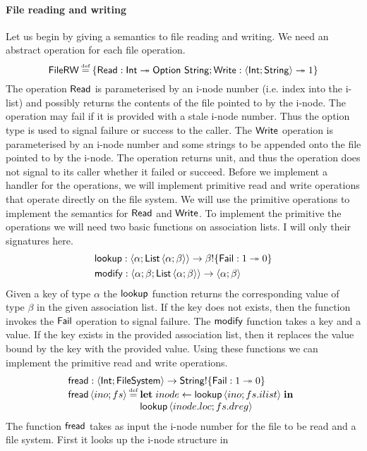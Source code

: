 \documentclass[12pt,phd,lfcs,twoside,openright,logo,leftchapter,normalheadings]{infthesis}
\theoremstyle{plain}
\theoremstyle{definition}
\begin{document}
\paragraph{File reading and writing}
%
Let us begin by giving a semantics to file reading and writing. We
need an abstract operation for each file operation.
%
\[
  \dec{FileRW} \defas \{\URead : \Int \opto \Option~\String;\UWrite : \Record{\Int;\String} \opto \UnitType\}
\]
%
The operation $\mathsf{Read}$ is parameterised by an i-node number
(i.e. index into the i-list) and possibly returns the contents of the
file pointed to by the i-node. The operation may fail if it is
provided with a stale i-node number. Thus the option type is used to
signal failure or success to the caller.
%
The $\mathsf{Write}$ operation is parameterised by an i-node number and some
strings to be appended onto the file pointed to by the i-node. The
operation returns unit, and thus the operation does not signal to its
caller whether it failed or succeed.
%
Before we implement a handler for the operations, we will implement
primitive read and write operations that operate directly on the file
system. We will use the primitive operations to implement the
semantics for $\mathsf{Read}$ and $\mathsf{Write}$. To implement the primitive the
operations we will need two basic functions on association lists. I
will only their signatures here.
%
\[
  \bl
    \lookup : \Record{\alpha;\List\,\Record{\alpha;\beta}} \to \beta \eff \{\Fail : \UnitType \opto \ZeroType\} \smallskip\\
    \modify : \Record{\alpha;\beta;\List\,\Record{\alpha;\beta}} \to \Record{\alpha;\beta}
  \el
\]
%
Given a key of type $\alpha$ the $\mathsf{lookup}$ function returns the
corresponding value of type $\beta$ in the given association list. If
the key does not exists, then the function invokes the $\mathsf{Fail}$
operation to signal failure.
%
The $\mathsf{modify}$ function takes a key and a value. If the key exists in
the provided association list, then it replaces the value bound by the
key with the provided value.
%
Using these functions we can implement the primitive read and write
operations.
%
\[
  \bl
    \fread : \Record{\Int;\FileSystem} \to \String \eff \{\Fail : \UnitType \opto \ZeroType\}\\
    \fread\,\Record{ino;fs} \defas
      \ba[t]{@{}l}
        \Let\;inode \revto \lookup\,\Record{ino; fs.ilist}\;\In\\
        \lookup\,\Record{inode.loc; fs.dreg}
      \el
  \el
\]
%
The function $\mathsf{fread}$ takes as input the i-node number for the file to
be read and a file system. First it looks up the i-node structure in
\end{document}
